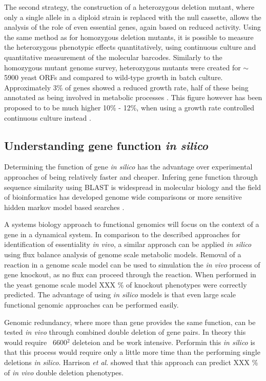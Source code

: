 The second strategy, the construction of a heterozygous deletion mutant, where only a single allele in a diploid strain is replaced with the null cassette, allows the analysis of the role of even essential genes, again based on reduced activity. Using the same method as for homozygous deletion mutants, it is possible to measure the heterozygous phenotypic effects quantitatively, using continuous culture and quantitative measurement of the molecular barcodes. Similarly to the homozygous mutant genome survey, heterozygous mutants were created for $\sim$5900 yeast ORFs and compared to wild-type growth in batch culture. Approximately 3\% of genes showed a reduced growth rate, half of these being annotated as being involved in metabolic processes \cite{Deutschbauer2005}. This figure however has been proposed to to be much higher 10\% - 12\%, when using a growth rate controlled continuous culture instead \cite{Papp2006}.

\subsection{Understanding gene function \emph{in silico}}

Determining the function of gene \emph{in silico} has the advantage over experimental approaches of being relatively faster and cheaper. Infering gene function through sequence similarity using BLAST \cite{blast} is widespread in molecular biology and the field of bioinformatics has developed genome wide comparisons \cite{blat} or more sensitive hidden markov model based searches \cite{hmmer}.

A systems biology approach to functional genomics will focus on the context of a gene in a dynamical system. In comparison to the described approaches for identification of essentiality \emph{in vivo}, a similar approach can be applied \emph{in silico} using flux balance analysis of genome scale metabolic models. Removal of a reaction in a genome scale model can be used to simulation the \emph{in vivo} process of gene knockout, as no flux can proceed through the reaction. When performed in the yeast genome scale model XXX \% of knockout phenotypes were correctly predicted. The advantage of using \emph{in silico} models is that even large scale functional genomic approaches can be performed easily. 

Genomic redundancy, where more than gene provides the same function, can be tested \emph{in vivo} through combined double deletion of gene pairs. In theory this would require ~6600$^2$ deleteion and be work intensive. Performin this \emph{in silico} is that this process would require only a little more time than the performing single deletions \emph{in silico}. Harrison \emph{et al.} \cite{double_deletion} showed that this approach can predict XXX \% of \emph{in vivo} double deletion phenotypes.

